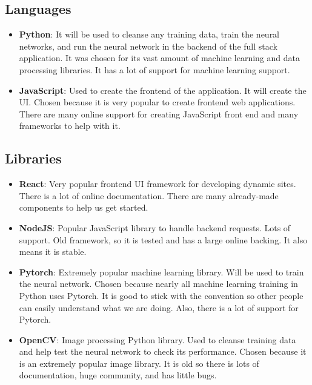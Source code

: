 \documentclass{article}
\begin{document}
\subsection{Languages}
\begin{itemize}
  \item \textbf{Python}: It will be used to cleanse any training data, train the neural networks,
    and run the neural network in the backend of the full stack application. It was chosen for its
    vast amount of machine learning and data processing libraries. It has a lot of support for
    machine learning support.
  \item \textbf{JavaScript}: Used to create the frontend of the application. It will create the UI.
    Chosen because it is very popular to create frontend web applications. There are many online 
    support for creating JavaScript front end and many frameworks to help with it.
\end{itemize}

\subsection{Libraries}
\begin{itemize}
  \item \textbf{React}: Very popular frontend UI framework for developing dynamic sites. There is
    a lot of online documentation. There are many already-made components to help us get started.
  \item \textbf{NodeJS}: Popular JavaScript library to handle backend requests. Lots of support. 
    Old framework, so it is tested and has a large online backing. It also means it is stable.
  \item \textbf{Pytorch}: Extremely popular machine learning library. Will be used to train the 
    neural network. Chosen because nearly all machine learning training in Python uses Pytorch. It
    is good to stick with the convention so other people can easily understand what we are doing. 
    Also, there is a lot of support for Pytorch.
  \item \textbf{OpenCV}: Image processing Python library. Used to cleanse training data and help
    test the neural network to check its performance. Chosen because it is an extremely popular
    image library. It is old so there is lots of documentation, huge community, and has little 
    bugs.
\end{itemize}
\end{document}
